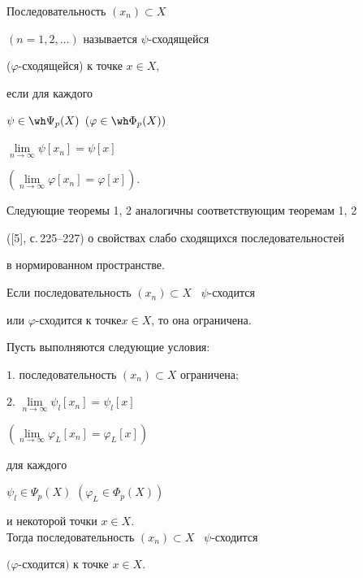 \begin{defn}


Последовательность $(x_{n}) \subset X$


$(n= 1,2,\dotsc)$ называется $\psi$-сходящейся


($\varphi$-сходящейся) к точке $x \in X$,


если для каждого


$\psi \in \wh \Psi_{p}(X)$ $(\varphi \in \wh \Phi_{p}(X))$ 


$\lim \limits_{n\rightarrow \infty}{\psi[x_{n}]} = \psi[x]$


$(\lim \limits_{n\rightarrow \infty}{\varphi[x_{n}]} =  \varphi[x])$.


\end{defn}





Следующие теоремы 1, 2 аналогичны соответствующим теоремам 1, 2


([5], с.\,225--227) о свойствах слабо сходящихся последовательностей


в нормированном пространстве.





\begin{thm}


Если последовательность $(x_{n}) \subset X$ \ $\psi$-сходится


или $\varphi$-сходится к точке\linebreak $x \in X$, то она ограничена.


\end{thm}





\begin{thm}


Пусть выполняются следующие условия: 





$1$. последовательность  $(x_{n}) \subset X$ ограничена$;$ 





$2$. $\lim \limits_{n\rightarrow \infty}{\psi_{l}[x_{n}]} =


\psi_{l}[x]$


$(\lim \limits_{n\rightarrow \infty}{\varphi_{L}[x_{n}]} = \varphi_{L}[x])$ 


для каждого


$\psi_{l} \in\Psi_{p}(X)$ $(\varphi_{L} \in \Phi_{p}(X))$ 


и некоторой точки $x \in X$. \\


Тогда последовательность $(x_{n}) \subset X$ \ $\psi$-сходится


$(\varphi$-сходится$)$ к точке $x \in X$.


\end{thm}





